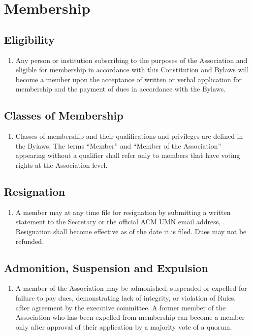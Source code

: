 \section{Membership}

\subsection{Eligibility}
\begin{enumerate}
	\item Any person or institution subscribing to the purposes of the Association and eligible for membership in accordance with this Constitution and Bylaws will become a member upon the acceptance of written or verbal application for membership and the payment of dues in accordance with the Bylaws.
\end{enumerate}

\subsection{Classes of Membership}
\begin{enumerate}
	\item Classes of membership and their qualifications and privileges are defined in the Bylaws. The terms ``Member'' and ``Member of the Association'' appearing without a qualifier shall refer only to members  that have voting rights at the Association level.
\end{enumerate}

\subsection{Resignation}
\begin{enumerate}
	\item A member may at any time file for resignation by submitting a written statement to the Secretary or the official ACM UMN email address, \email. Resignation shall become effective as of the date it is filed. Dues may not be refunded.
\end{enumerate}

\subsection{Admonition, Suspension and Expulsion}
\begin{enumerate}
	\item A member of the Association may be admonished, suspended or expelled for failure to pay dues, demonstrating lack of integrity, or violation of Rules, after agreement by the executive committee. A former member of the Association who has been expelled from membership can become a member only after approval of their application by a majority vote of a quorum.
\end{enumerate}

